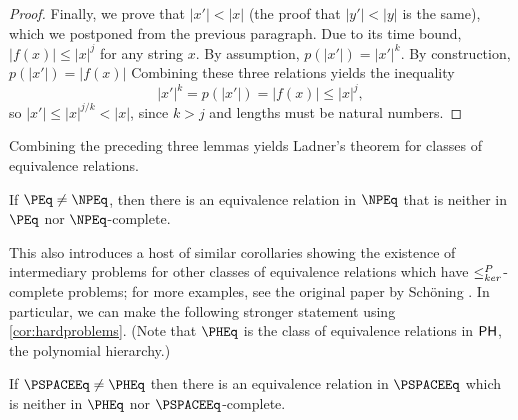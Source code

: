 \begin{proof}
  Finally, we prove that $|x'| < |x|$ (the proof that $|y'| < |y|$ is the same), which we postponed from the previous paragraph.
  Due to its time bound, $|f(x)| \leq |x|^j$ for any string $x$.
  By assumption, $p(|x'|) = |x'|^k$.
  By construction, $p(|x'|) = |f(x)|$
  Combining these three relations yields the inequality
  \begin{equation*}
    |x'|^k = p(|x'|) = |f(x)| \leq |x|^j,
  \end{equation*}
  so $|x'| \leq |x|^{j / k} < |x|$, since $k > j$ and lengths must be natural numbers.
\end{proof}

Combining the preceding three lemmas yields Ladner's theorem for classes of equivalence relations.

\begin{theorem}\label{thm:intermediary}
  If $\PEq \neq \NPEq$, then there is an equivalence relation in $\NPEq$ that is neither in $\PEq$ nor $\NPEq$-complete.
\end{theorem}


This also introduces a host of similar corollaries showing the existence of intermediary problems for other classes of equivalence relations which have $\leq^{P}_{ker}$-complete problems; for more examples, see the original paper by Schöning \autocite{schoning82}.
In particular, we can make the following stronger statement using \autoref{cor:hardproblems}.
(Note that $\PHEq$ is the class of equivalence relations in ${\mathsf{PH}}$, the polynomial hierarchy.)
\begin{corollary}\label{cor:pspace}
  If $\PSPACEEq \neq \PHEq$ then there is an equivalence relation in $\PSPACEEq$ which is neither in $\PHEq$ nor $\PSPACEEq$-complete.
\end{corollary}
